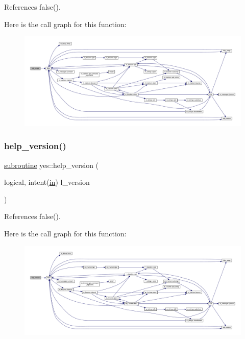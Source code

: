 References false().

Here is the call graph for this function\+:
\nopagebreak
\begin{figure}[H]
\begin{center}
\leavevmode
\includegraphics[width=350pt]{__yes_8f90_a29b1df982543a5b5ca4d5bb9a5985985_cgraph}
\end{center}
\end{figure}
\mbox{\label{__yes_8f90_a442a735af6d8522c4de7080520d5fe9a}} 
\subsubsection{\texorpdfstring{help\+\_\+version()}{help\_version()}}
{\footnotesize\ttfamily \hyperlink{M__stopwatch_83_8txt_acfbcff50169d691ff02d4a123ed70482}{subroutine} yes\+::help\+\_\+version (\begin{DoxyParamCaption}\item[{logical, intent(\hyperlink{M__journal_83_8txt_afce72651d1eed785a2132bee863b2f38}{in})}]{l\+\_\+version }\end{DoxyParamCaption})}



References false().

Here is the call graph for this function\+:
\nopagebreak
\begin{figure}[H]
\begin{center}
\leavevmode
\includegraphics[width=350pt]{__yes_8f90_a442a735af6d8522c4de7080520d5fe9a_cgraph}
\end{center}
\end{figure}
\mbox{\label{__yes_8f90_a5366917561a9747837d99d886f06cbd7}} 
